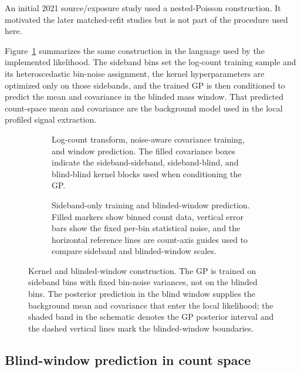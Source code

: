 An initial 2021 source/exposure study used a nested-Poisson construction. It motivated
the later matched-refit studies but is not part of the procedure used here.

Figure~\ref{fig:gpr-window-construction} summarizes the same construction in the
language used by the implemented likelihood. The sideband bins set the log-count
training sample and its heteroscedastic bin-noise assignment, the kernel hyperparameters
are optimized only on those sidebands, and the trained GP is then conditioned to predict
the mean and covariance in the blinded mass window. That predicted count-space mean and
covariance are the background model used in the local profiled signal extraction.

\begin{figure}[H]
\centering
\begin{subfigure}[t]{0.52\linewidth}
  \centering
  \caption{Log-count transform, noise-aware covariance training, and window prediction.
  The filled covariance boxes indicate the sideband-sideband, sideband-blind, and
  blind-blind kernel blocks used when conditioning the GP.}
\end{subfigure}
\hfill
\begin{subfigure}[t]{0.45\linewidth}
  \centering
  \caption{Sideband-only training and blinded-window prediction. Filled markers show
  binned count data, vertical error bars show the fixed per-bin statistical noise, and
  the horizontal reference lines are count-axis guides used to compare sideband and
  blinded-window scales.}
\end{subfigure}
\caption{Kernel and blinded-window construction. The GP is
trained on sideband bins with fixed bin-noise variances, not on the blinded bins. The
posterior prediction in the blind window supplies the background mean and covariance
that enter the local likelihood; the shaded band in the schematic denotes the GP
posterior interval and the dashed vertical lines mark the blinded-window boundaries.}
\label{fig:gpr-window-construction}
\end{figure}

\subsection{Blind-window prediction in count space}
\label{sec:blind-window-prediction}

